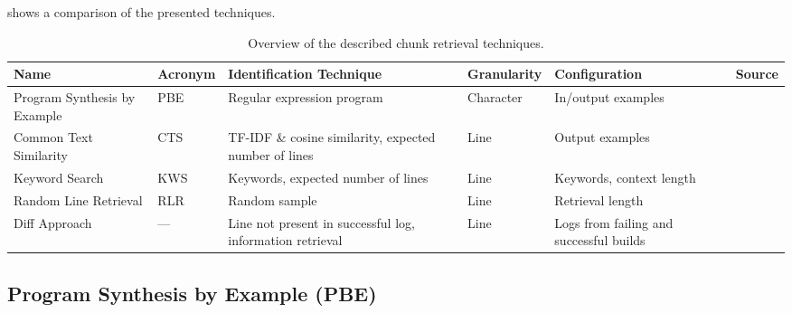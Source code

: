  shows a comparison of the presented techniques.

\begin{table}[]
\centering
\caption{Overview of the described chunk retrieval techniques.}
\begin{tabularx}{\textwidth}{@{}XlXlXX@{}}
\toprule
Name			     & Acronym & Identification Technique
& Granularity & Configuration & Source		  \\
\midrule
Program Synthesis by Example & PBE     & Regular expression program
& Character   & In/output examples	\\
Common Text Similarity	     & CTS     & TF-IDF \& cosine similarity,
expected number of lines & Line        & Output examples	   \\
Keyword Search		     & KWS     & Keywords, expected number of
lines			 & Line        & Keywords, context length  \\
Random Line Retrieval	     & RLR     & Random sample
& Line	      & Retrieval length	  \\
Diff Approach		     & ---     & Line not present in successful
log, information retrieval  & Line	  & Logs from failing and
successful builds      \\
\bottomrule
\end{tabularx}
\label{tab:ctr}
\end{table}

\subsection{Program Synthesis by Example (PBE)}
\label{sec:expl-pbe}

